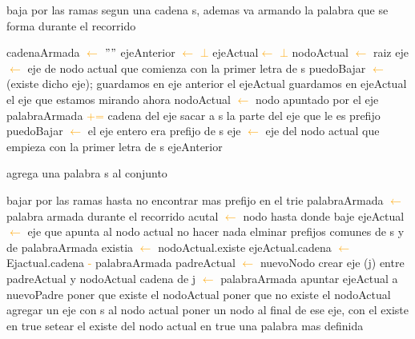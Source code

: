 \begin{algorithm}
\caption{baja por las ramas segun una cadena s, ademas va armando la palabra que se forma durante el recorrido }
\begin{algorithmic}[1]
\STATE cadenaArmada \textcolor{orange}{$\leftarrow$}  $""$
\STATE ejeAnterior \textcolor{orange}{$\leftarrow$}  \textcolor{orange}{$\bot$}
\STATE ejeActual\textcolor{orange}{$\leftarrow$}  \textcolor{orange}{$\bot$}
\STATE nodoActual \textcolor{orange}{$\leftarrow$} raiz
\STATE eje \textcolor{orange}{$\leftarrow$} eje de nodo actual que comienza con la primer letra de s
\STATE puedoBajar \textcolor{orange}{$\leftarrow$} (existe dicho eje);
	\STATE guardamos en eje anterior el ejeActual
	\STATE guardamos en ejeActual el eje que estamos mirando ahora 
	\STATE nodoActual \textcolor{orange}{$\leftarrow$} nodo apuntado por el eje
	\STATE palabraArmada \textcolor{orange}{+=} cadena del eje
	\STATE sacar a s la parte del eje que le es prefijo
	\STATE puedoBajar \textcolor{orange}{$\leftarrow$} el eje entero era prefijo de s
	\STATE eje \textcolor{orange}{$\leftarrow$} eje del nodo actual que empieza con la primer letra de s
\ENDWHILE
\RETURN ejeAnterior
\label{alg:bajar}
\end{algorithmic}
\end{algorithm}	

\begin{algorithm}
\caption{agrega una palabra s al conjunto}
\begin{algorithmic}[1]
\STATE bajar por las ramas hasta no encontrar mas prefijo en el trie
\STATE palabraArmada \textcolor{orange}{$\leftarrow$} palabra armada durante el recorrido
\STATE acutal \textcolor{orange}{$\leftarrow$} nodo hasta donde baje
\STATE ejeActual \textcolor{orange}{$\leftarrow$} eje que apunta al nodo actual
	\STATE no hacer nada
\ELSE
	\STATE elminar prefijos comunes de s y de palabraArmada
		\STATE {} 
		\STATE existia \textcolor{orange}{$\leftarrow$} nodoActual.existe
		\STATE ejeActual.cadena \textcolor{orange}{$\leftarrow$} Ejactual.cadena \textcolor{orange}{-} palabraArmada  
		\STATE padreActual \textcolor{orange}{$\leftarrow$} nuevoNodo 
		\STATE crear eje (j) entre padreActual y nodoActual
		\STATE cadena de j \textcolor{orange}{$\leftarrow$} palabraArmada
		\STATE apuntar ejeActual a nuevoPadre 
			\STATE poner que existe el nodoActual
		\ELSE
			\STATE poner que no existe el nodoActual
		\ENDIF
\ENDIF
\ENDIF
		\STATE agregar un eje con s al nodo actual
		\STATE poner un nodo al final de ese eje, con el existe en true
	\ELSE
		\STATE setear el existe del nodo actual en true
	\ENDIF
\STATE una palabra mas definida
\end{algorithmic}
\end{algorithm}

